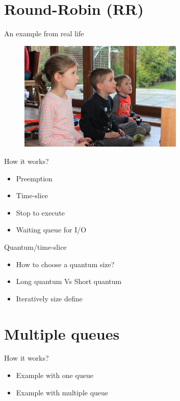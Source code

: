 \documentclass[10pt, compress, aspectratio=169]{beamer}
\begin{document}
\section{Round-Robin (RR)}
\begin{frame}{An example from real life}
  \begin{figure}[ht]
    \centering
    \includegraphics[width=0.7\textwidth, keepaspectratio=true]{images/play_video_game.jpg}
  \end{figure}
\end{frame}

\begin{frame}{How it works?}
  \begin{itemize}
    \item Preemption
    \item Time-slice
    \item Stop to execute
    \item Waiting queue for I/O
  \end{itemize}
\end{frame}

\begin{frame}{Quantum/time-slice}
  \begin{itemize}
    \item How to choose a quantum size?
    \item Long quantum Vs Short quantum
    \item Iteratively size define
  \end{itemize}
\end{frame}

\section{Multiple queues}
\begin{frame}{How it works?}
  \begin{itemize}
    \item Example with one queue
    \item Example with multiple queue
  \end{itemize}
\end{frame}
\end{document}
